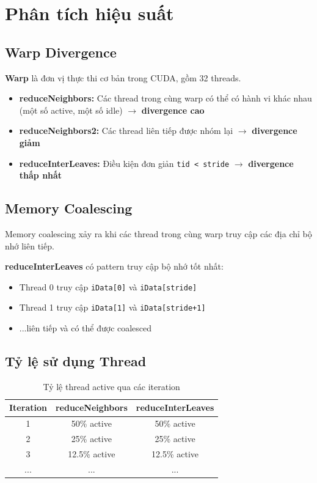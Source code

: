 \documentclass[12pt,a4paper]{article}
\begin{document}
\section{Phân tích hiệu suất}

\subsection{Warp Divergence}

\textbf{Warp} là đơn vị thực thi cơ bản trong CUDA, gồm 32 threads.

\begin{itemize}
    \item \textbf{reduceNeighbors:} Các thread trong cùng warp có thể có hành vi khác nhau (một số active, một số idle) $\rightarrow$ \textbf{divergence cao}
    \item \textbf{reduceNeighbors2:} Các thread liên tiếp được nhóm lại $\rightarrow$ \textbf{divergence giảm}
    \item \textbf{reduceInterLeaves:} Điều kiện đơn giản \texttt{tid < stride} $\rightarrow$ \textbf{divergence thấp nhất}
\end{itemize}

\subsection{Memory Coalescing}

Memory coalescing xảy ra khi các thread trong cùng warp truy cập các địa chỉ bộ nhớ liên tiếp.

\textbf{reduceInterLeaves} có pattern truy cập bộ nhớ tốt nhất:
\begin{itemize}
    \item Thread 0 truy cập \texttt{iData[0]} và \texttt{iData[stride]}
    \item Thread 1 truy cập \texttt{iData[1]} và \texttt{iData[stride+1]}
    \item ...liên tiếp và có thể được coalesced
\end{itemize}

\subsection{Tỷ lệ sử dụng Thread}

\begin{table}[h]
\centering
\caption{Tỷ lệ thread active qua các iteration}
\label{tab:thread_utilization}
\begin{tabular}{|c|c|c|}
\hline
\textbf{Iteration} & \textbf{reduceNeighbors} & \textbf{reduceInterLeaves} \\
\hline
1 & 50\% active & 50\% active \\
\hline
2 & 25\% active & 25\% active \\
\hline
3 & 12.5\% active & 12.5\% active \\
\hline
... & ... & ... \\
\hline
\end{tabular}
\end{table}
\end{document}
